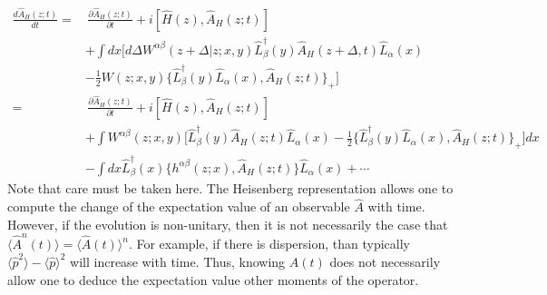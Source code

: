 \documentclass[aps,pra,showpacs,citeautoscript,amsmath,amssymb,floatfix,superscriptaddress,bbm, verbatim,amsfonts,changes,11pt,nofootinbib,longbibliography]{revtex4-2}
\def\z{{z}}
\def\L{{\hat{L}}}
\def\Hq{\hat{H}}
\def\dist{{\Delta}}
\def\ddist{{d\!\dist}}
\def\rate{{W}}
\def\ab{^{\alpha\beta}}
\def\PB{\}}
\def\hatA{\hat{A}}
\begin{document}
\begin{align}
\frac{d\hatA_H(\z;t)}{dt}
=&
\, \frac{\partial\hatA_H(\z;t)}{\partial t}
+i[\Hq(\z),\hatA_H(\z;t)]
\nonumber\\
 &+ \int dx\Big[\ddist 
  \rate^{\alpha\beta}(\z+\dist|\z;x,y)\L_{\beta}^\dagger(y)
  \hatA_H(\z+\dist,t)
  \L_{\alpha}(x)
  \nonumber\\
  &-
  \frac{1}{2}
\rate(\z;x,y)
\{\L_\beta^\dagger(y)\L_\alpha(x),\hatA_H(\z;t)
\}_+\Big]
\nonumber\\
=&
\,\frac{\partial\hatA_H(\z;t)}{\partial t}
+i[\Hq(\z),\hatA_H(\z;t)]
\nonumber\\
&+\int 
  \rate\ab(\z;x,y)\Big[\L_{\beta}^\dagger(y)\hatA_H(\z;t)\L_{\alpha}(x)
  -\frac{1}{2}
\{\L_{\beta}^\dagger(y)\L_{\alpha}(x),\hatA_H(\z;t)\}_+   
\Big] dx
\nonumber\\
&-
\int dx \L_{\beta}^\dagger(x)\{h^{\alpha\beta}(\z;x),\hatA_H(\z;t)\PB\L_{\alpha}(x)
   + \cdots
\end{align}
Note that care must be taken here. The Heisenberg representation allows one to compute the change of the expectation value of an observable $\hatA$ with time. However, if the evolution is non-unitary, then it is not necessarily the case that $\langle \hatA^n(t)\rangle=\langle \hatA(t)\rangle^n$. For example, if there is dispersion, than typically $\langle \hat{p}^2\rangle-\langle \hat{p} \rangle^2$ will increase with time. Thus, knowing $\hatA(t)$ does not necessarily allow one to deduce the expectation value other moments of the operator.
%
%
%
%
%
%
%
\end{document}
